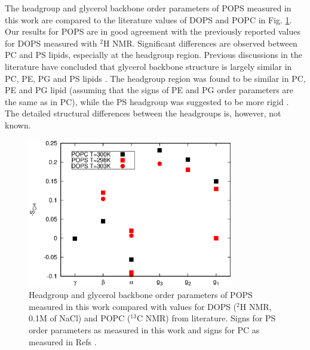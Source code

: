 \documentclass[aps,prl,superscriptaddress,twocolumn]{revtex4}
\begin{document}
The headgroup and glycerol backbone order parameters of 
POPS measured in this work are compared to the literature values of
DOPS \cite{browning80} and POPC \cite{ferreira13} in Fig. \ref{HGorderParameters}. 
Our results for POPS are in good agreement with the previously reported
values for DOPS measured with $^2$H NMR. Significant differences are
observed between PC and PS lipids, especially at the headgroup region.  
Previous discussions in the literature have concluded that  
glycerol backbone structure is largely similar in
PC, PE, PG and PS lipids \cite{gally81}. The headgroup region was
found to be similar in PC, PE and PG lipid (assuming that the signs of PE and PG
order parameters are the same as in PC), while the PS headgroup was suggested
to be more rigid \cite{wohlgemuth80,buldt81}. 
The detailed structural differences between the headgroups is, however, not known.
\begin{figure}[]
  \centering
  \includegraphics[width=9.0cm]{../Figs/HGorderparametersPCPS.eps}
  \caption{\label{HGorderParameters}
    Headgroup and glycerol backbone order parameters of POPS measured in this work compared
    with values for DOPS ($^2$H NMR, 0.1M of NaCl) \cite{browning80} and 
    POPC  ($^{13}$C NMR) \cite{ferreira13} from literature. Signs for PS order parameters
    as measured in this work and signs for PC as measured in Refs \cite{??,ferreira16}.
  }
\end{figure}


\end{document}
